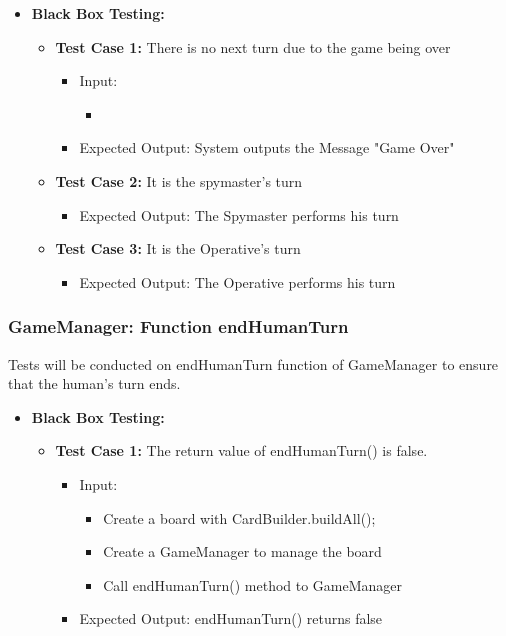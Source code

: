 \documentclass[12pt]{article}
\begin{document}
\begin{itemize}
    \item \textbf{Black Box Testing:}
    \begin{itemize}
       \item \textbf{Test Case 1:} There is no next turn due to the game being over
            \begin{itemize}
            \item Input:
                \begin{itemize}
                    \item 
                \end{itemize}
            \item Expected Output: System outputs the Message "Game Over"
            \end{itemize}
        \item \textbf{Test Case 2:} It is the spymaster's turn
            \begin{itemize}
            
            \item Expected Output: The Spymaster performs his turn
            \end{itemize}
        \item \textbf{Test Case 3:} It is the Operative's turn
            \begin{itemize}
            
            \item Expected Output: The Operative performs his turn
            \end{itemize}
    \end{itemize}
\end{itemize}

\subsubsection{GameManager: Function endHumanTurn}
Tests will be conducted on endHumanTurn function of GameManager to ensure that the human's turn ends.

\begin{itemize}
    \item \textbf{Black Box Testing:}
    \begin{itemize}
       \item \textbf{Test Case 1:} The return value of endHumanTurn() is false.
            \begin{itemize}
            \item Input: 
                \begin{itemize}
                    \item Create a board with CardBuilder.buildAll();
                    \item Create a GameManager to manage the board
                    \item Call endHumanTurn() method to GameManager
                \end{itemize}
            \item Expected Output: endHumanTurn() returns false
            \end{itemize}
    \end{itemize}
\end{itemize}
\end{document}
